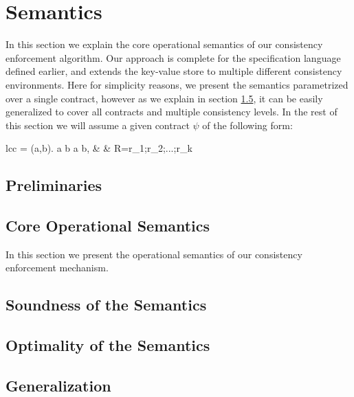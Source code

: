 %
%
\section{Semantics}

In this section we explain the core operational semantics of our
consistency enforcement algorithm. 
Our approach is complete for the specification language defined earlier,
and extends the key-value store to multiple different consistency
environments. Here for simplicity reasons, we present the semantics 
parametrized over a single contract,
however as we explain in section \ref{subsec:generalization}, it can be easily
generalized to cover all contracts and multiple consistency levels. In
the rest of this section we will assume a given contract $\psi$ of the
following form:
	\begin{smathpar}
	\begin{array}{lcc}
		\psi = \forall (a,b). a  b  \Rightarrow a
		 b, & \spc & R=r_1;r_2;...;r_k \\
	\end{array}
	\end{smathpar}

\subsection{Preliminaries}

\newpage
\subsection{Core Operational Semantics}
In this section we present the operational semantics of our consistency
enforcement mechanism.


\newpage
\subsection{Soundness of the Semantics}

\newpage
\subsection{Optimality of the Semantics}

\subsection{Generalization}
\label{subsec:generalization}


